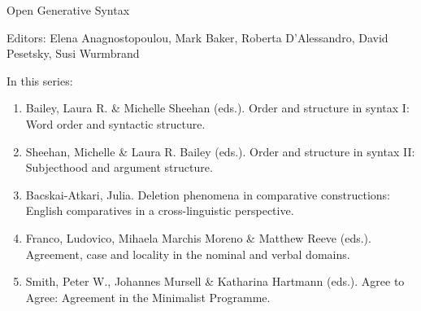 {\large Open Generative Syntax}

\bigskip

Editors:   Elena Anagnostopoulou,
    Mark Baker,
    Roberta D’Alessandro,
    David Pesetsky,
    Susi Wurmbrand


\bigskip

In this series:

\begin{enumerate}
\item Bailey, Laura R. \& Michelle Sheehan (eds.). Order and structure in syntax I: Word order and syntactic structure.
\item Sheehan, Michelle \& Laura R. Bailey (eds.).  Order and structure in syntax II: Subjecthood and argument structure.
\item Bacskai-Atkari, Julia. Deletion phenomena in comparative constructions: English comparatives in a cross-linguistic perspective.
\item Franco, Ludovico, Mihaela Marchis Moreno \& Matthew Reeve (eds.). Agreement, case and locality in the nominal and verbal domains.
\item Smith, Peter W., Johannes Mursell \& Katharina Hartmann (eds.). Agree to Agree: Agreement in the Minimalist Programme.
\end{enumerate}



\vfill

